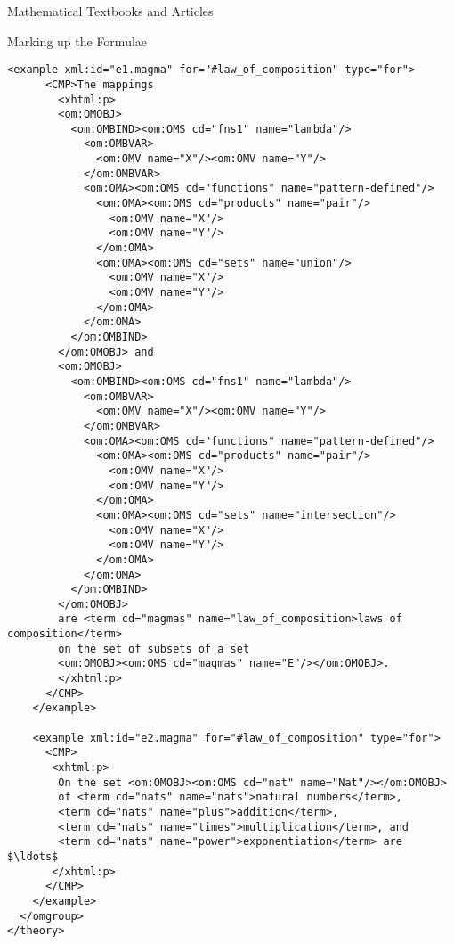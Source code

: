 \begin{tchapter}[id=algebra,short=Textbooks and Articles]{Mathematical Textbooks and Articles}
\begin{tsection}[id=formulae]{Marking up the Formulae}
\begin{lstlisting}[label=lst:example-formulae,mathescape,
    caption={Examples for magmas with {\openmath} objects},
    index={example,CMP,OMOBJ,OMBIND,OMS,OMA,OMV}]
    <example xml:id="e1.magma" for="#law_of_composition" type="for">
      <CMP>The mappings 
        <xhtml:p>
        <om:OMOBJ>
          <om:OMBIND><om:OMS cd="fns1" name="lambda"/>
            <om:OMBVAR>
              <om:OMV name="X"/><om:OMV name="Y"/>
            </om:OMBVAR>
            <om:OMA><om:OMS cd="functions" name="pattern-defined"/>
              <om:OMA><om:OMS cd="products" name="pair"/>
                <om:OMV name="X"/>
                <om:OMV name="Y"/>
              </om:OMA>
              <om:OMA><om:OMS cd="sets" name="union"/>
                <om:OMV name="X"/>
                <om:OMV name="Y"/>
              </om:OMA>
            </om:OMA>
          </om:OMBIND>
        </om:OMOBJ> and 
        <om:OMOBJ>
          <om:OMBIND><om:OMS cd="fns1" name="lambda"/>
            <om:OMBVAR>
              <om:OMV name="X"/><om:OMV name="Y"/>
            </om:OMBVAR>  
            <om:OMA><om:OMS cd="functions" name="pattern-defined"/>
              <om:OMA><om:OMS cd="products" name="pair"/>
                <om:OMV name="X"/>
                <om:OMV name="Y"/>
              </om:OMA>
              <om:OMA><om:OMS cd="sets" name="intersection"/>
                <om:OMV name="X"/>
                <om:OMV name="Y"/>
              </om:OMA>
            </om:OMA>
          </om:OMBIND>
        </om:OMOBJ>
        are <term cd="magmas" name="law_of_composition>laws of composition</term>
        on the set of subsets of a set 
        <om:OMOBJ><om:OMS cd="magmas" name="E"/></om:OMOBJ>.
        </xhtml:p>
      </CMP>
    </example>
    
    <example xml:id="e2.magma" for="#law_of_composition" type="for">
      <CMP>
       <xhtml:p>
        On the set <om:OMOBJ><om:OMS cd="nat" name="Nat"/></om:OMOBJ> 
        of <term cd="nats" name="nats">natural numbers</term>, 
        <term cd="nats" name="plus">addition</term>, 
        <term cd="nats" name="times">multiplication</term>, and 
        <term cd="nats" name="power">exponentiation</term> are $\ldots$
       </xhtml:p>
      </CMP>
    </example>
  </omgroup>
</theory>
\end{lstlisting}


\end{tsection}
\end{tchapter}
